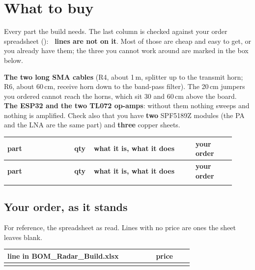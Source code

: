 \documentclass[10pt]{article}
\begin{document}
\newpage
\section{What to buy}\label{sec:parts}

Every part the build needs. The last column is checked against your order spreadsheet (): \textbf{\partsMissing\ lines are not on it}. Most of those are cheap and easy to get, or you already have them; the three you cannot work around are marked in the box below.

\begin{warn}
\textbf{The two long SMA cables} (R4, about 1\,m, splitter up to the transmit horn; R6, about 60\,cm, receive horn down to the band-pass filter). The 20\,cm jumpers you ordered cannot reach the horns, which sit 30 and 60\,cm above the board. \textbf{The ESP32 and the two TL072 op-amps}: without them nothing sweeps and nothing is amplified. Check also that you have \textbf{two} SPF5189Z modules (the PA and the LNA are the same part) and \textbf{three} copper sheets.
\end{warn}

{\small
\begin{longtable}{@{}P{0.27\linewidth}P{0.075\linewidth}P{0.41\linewidth}P{0.165\linewidth}@{}}
\toprule
\textbf{part} & \textbf{qty} & \textbf{what it is, what it does} & \textbf{your order} \\ \midrule
\endfirsthead
\toprule
\textbf{part} & \textbf{qty} & \textbf{what it is, what it does} & \textbf{your order} \\ \midrule
\endhead
\bottomrule
\endfoot
{}
\end{longtable}}

\subsection{Your order, as it stands}
For reference, the spreadsheet as read. Lines with no price are ones the sheet leaves blank.

{\small
\begin{longtable}{@{}P{0.6\linewidth}P{0.15\linewidth}@{}}
\toprule
\textbf{line in BOM\_Radar\_Build.xlsx} & \textbf{price} \\ \midrule
\endhead
{}
\bottomrule
\end{longtable}}
\end{document}
